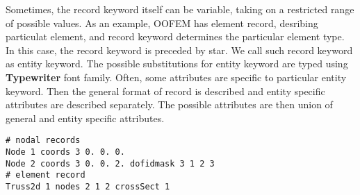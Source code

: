\documentclass[a4paper]{article}
\newcommand{\entKeywordInst}[1]{\textbf{#1}} %
\begin{document}
Sometimes, the record keyword itself can be variable, taking on a restricted range of possible values.
As an example, OOFEM has element record, desribing particulat element, and record keyword determines the  particular element type.
In this case, the record keyword is preceded by star. We call such record keyword as entity keyword. The possible
substitutions for entity keyword are typed using \entKeywordInst{Typewriter} font family.
Often, some attributes are specific to particular entity keyword. Then the general format of record is described and entity specific attributes are described separately. The possible attributes are then union of general and entity specific attributes.

\begin{lstlisting}[style=oofem, language=oofeminput, caption={Example of input records}]
# nodal records
Node 1 coords 3 0. 0. 0.
Node 2 coords 3 0. 0. 2. dofidmask 3 1 2 3
# element record
Truss2d 1 nodes 2 1 2 crossSect 1
\end{lstlisting}
\end{document}

